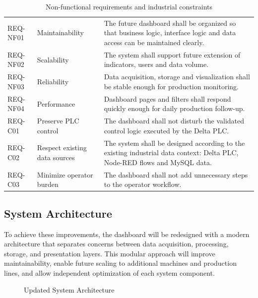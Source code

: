 \begin{table}[H]
\centering
\caption{Non-functional requirements and industrial constraints}
\begin{tabularx}{\textwidth}{|P{0.16\textwidth}|P{0.27\textwidth}|Y|}
\hline
{}
 &  &  \\
\hline
REQ-NF01 & Maintainability & The future dashboard shall be organized so that business logic, interface logic and data access can be maintained clearly. \\
\hline
REQ-NF02 & Scalability & The system shall support future extension of indicators, users and data volume. \\
\hline
REQ-NF03 & Reliability & Data acquisition, storage and visualization shall be stable enough for production monitoring. \\
\hline
REQ-NF04 & Performance & Dashboard pages and filters shall respond quickly enough for daily production follow-up. \\
\hline
REQ-C01 & Preserve PLC control & The dashboard shall not disturb the validated control logic executed by the Delta PLC. \\
\hline
REQ-C02 & Respect existing data sources & The system shall be designed according to the existing industrial data context: Delta PLC, Node-RED flows and MySQL data. \\
\hline
REQ-C03 & Minimize operator burden & The dashboard shall not add unnecessary steps to the operator workflow. \\
\hline
\end{tabularx}
\label{tab:chapter1-2}
\end{table}

\subsection{\fontsize{14}{17}\selectfont System Architecture}

\hspace*{\parindent} To achieve these improvements, the dashboard will be redesigned with a modern architecture that separates concerns between data acquisition, processing, storage, and presentation layers. This modular approach will improve maintainability, enable future scaling to additional machines and production lines, and allow independent optimization of each system component.

\begin{figure}[tbh]
\centering
{}
\caption{Updated System Architecture}
\label{fig:chapter1-6}
\end{figure}

